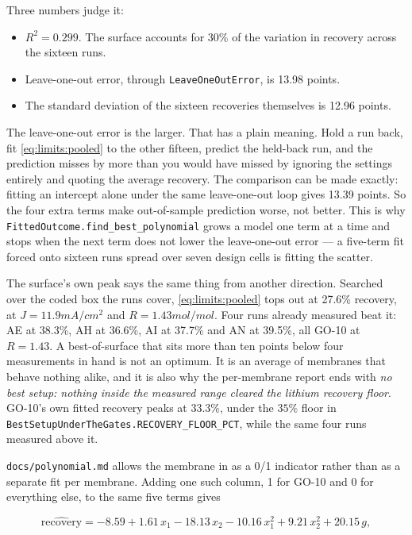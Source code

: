 Three numbers judge it:

\begin{itemize}[nosep]
  \item $R^2 = 0.299$. The surface accounts for 30\% of the variation in recovery across
        the sixteen runs.
  \item Leave-one-out error, through \texttt{LeaveOneOutError}, is 13.98 points.
  \item The standard deviation of the sixteen recoveries themselves is 12.96 points.
\end{itemize}

The leave-one-out error is the larger. That has a plain meaning. Hold a run back, fit
\eqref{eq:limits:pooled} to the other fifteen, predict the held-back run, and the
prediction misses by more than you would have missed by ignoring the settings entirely
and quoting the average recovery. The comparison can be made exactly: fitting an
intercept alone under the same leave-one-out loop gives 13.39 points. So the four extra
terms make out-of-sample prediction worse, not better. This is why
\texttt{FittedOutcome.find\_best\_polynomial} grows a model one term at a time and stops
when the next term does not lower the leave-one-out error --- a five-term fit forced onto
sixteen runs spread over seven design cells is fitting the scatter.

The surface's own peak says the same thing from another direction. Searched over the
coded box the runs cover, \eqref{eq:limits:pooled} tops out at 27.6\% recovery, at
$J = 11.9\unit{mA/cm^2}$ and $R = 1.43\unit{mol/mol}$. Four runs already measured beat it:
AE at 38.3\%, AH at 36.6\%, AI at 37.7\% and AN at 39.5\%, all GO-10 at $R = 1.43$. A
best-of-surface that sits more than ten points below four measurements in hand is not an
optimum. It is an average of membranes that behave nothing alike, and it is also why the
per-membrane report ends with \emph{no best setup: nothing inside the measured range
cleared the lithium recovery floor}. GO-10's own fitted recovery peaks at 33.3\%, under
the $35\%$ floor in \texttt{BestSetupUnderTheGates.RECOVERY\_FLOOR\_PCT}, while the same
four runs measured above it.

\texttt{docs/polynomial.md} allows the membrane in as a 0/1 indicator rather than as a
separate fit per membrane. Adding one such column, 1 for GO-10 and 0 for everything else,
to the same five terms gives

\begin{equation}
  \widehat{\text{recovery}} = -8.59 + 1.61\,x_1 - 18.13\,x_2 - 10.16\,x_1^2
    + 9.21\,x_2^2 + 20.15\,g ,
  \label{eq:limits:indicator}
\end{equation}

